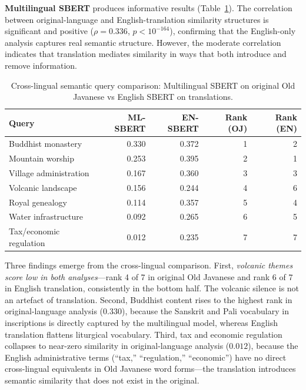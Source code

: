 \documentclass[12pt]{article}
\begin{document}
\textbf{Multilingual SBERT} produces informative results (Table~\ref{tab:crosslingual}).
The correlation between original-language and English-translation similarity structures is significant and positive ($\rho = 0.336$, $p < 10^{-164}$), confirming that the English-only analysis captures real semantic structure.
However, the moderate correlation indicates that translation mediates similarity in ways that both introduce and remove information.

\begin{table}[htbp]
\centering
\caption{Cross-lingual semantic query comparison: Multilingual SBERT on original Old Javanese vs English SBERT on translations.}
\label{tab:crosslingual}
\begin{tabular}{lrrrr}
\toprule
\textbf{Query} & \textbf{ML-SBERT} & \textbf{EN-SBERT} & \textbf{Rank (OJ)} & \textbf{Rank (EN)} \\
\midrule
Buddhist monastery       & 0.330 & 0.372 & 1 & 2 \\
Mountain worship         & 0.253 & 0.395 & 2 & 1 \\
Village administration   & 0.167 & 0.360 & 3 & 3 \\
Volcanic landscape       & 0.156 & 0.244 & 4 & 6 \\
Royal genealogy          & 0.114 & 0.357 & 5 & 4 \\
Water infrastructure     & 0.092 & 0.265 & 6 & 5 \\
Tax/economic regulation  & 0.012 & 0.235 & 7 & 7 \\
\bottomrule
\end{tabular}
\end{table}

Three findings emerge from the cross-lingual comparison.
First, \emph{volcanic themes score low in both analyses}---rank 4 of 7 in original Old Javanese and rank 6 of 7 in English translation, consistently in the bottom half.
The volcanic silence is not an artefact of translation.
Second, Buddhist content rises to the highest rank in original-language analysis ($0.330$), because the Sanskrit and Pali vocabulary in inscriptions is directly captured by the multilingual model, whereas English translation flattens liturgical vocabulary.
Third, tax and economic regulation collapses to near-zero similarity in original-language analysis ($0.012$), because the English administrative terms (``tax,'' ``regulation,'' ``economic'') have no direct cross-lingual equivalents in Old Javanese word forms---the translation introduces semantic similarity that does not exist in the original.
\end{document}
